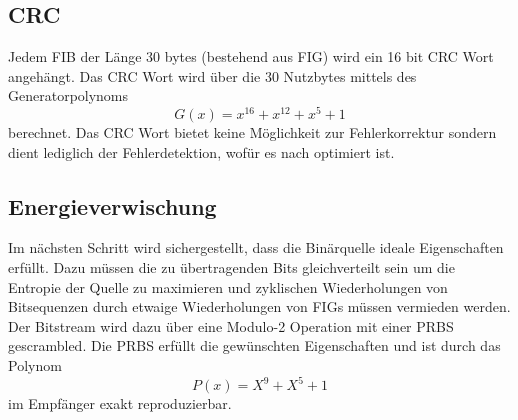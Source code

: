 \subsection{\ac{CRC}}
\label{sec:crc}
Jedem \ac{FIB} der Länge 30 bytes (bestehend aus \ac{FIG}) wird ein 16 bit \ac{CRC} Wort angehängt. Das \ac{CRC} Wort wird über die 30 Nutzbytes mittels des Generatorpolynoms
\begin{equation}
G(x) = x^{16} + x^{12} + x^5 + 1
\end{equation}
berechnet. Das CRC Wort bietet keine Möglichkeit zur Fehlerkorrektur sondern dient lediglich der Fehlerdetektion, wofür es nach \cite{crc:recommendation} optimiert ist.

\subsection{Energieverwischung}
\label{sec:energieverwischung}
Im nächsten Schritt wird sichergestellt, dass die Binärquelle ideale Eigenschaften erfüllt. Dazu müssen die zu übertragenden Bits gleichverteilt sein um die Entropie der Quelle zu maximieren und zyklischen Wiederholungen von Bitsequenzen durch etwaige Wiederholungen von \ac{FIG}s müssen vermieden werden. Der Bitstream wird dazu über eine Modulo-2 Operation mit einer \ac{PRBS} gescrambled. Die \ac{PRBS} erfüllt die gewünschten Eigenschaften und ist durch das Polynom
\begin{equation}
\label{eq:energy_dispersal}
P(x) = X^9 + X^5 + 1
\end{equation}
im Empfänger exakt reproduzierbar.

